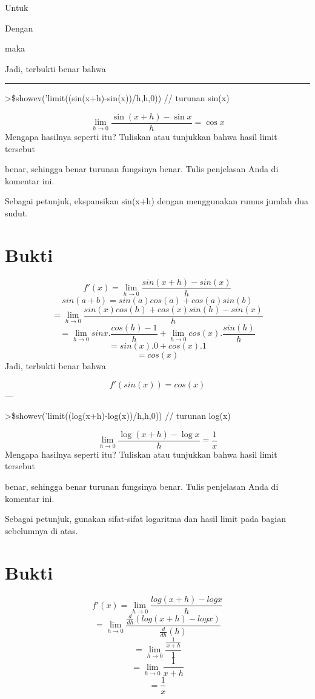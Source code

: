 \documentclass[
]{book}
\begin{document}
Untuk

Dengan

maka

Jadi, terbukti benar bahwa

\begin{center}\rule{0.5\linewidth}{0.5pt}\end{center}

\textgreater\$showev('limit((sin(x+h)-sin(x))/h,h,0)) // turunan sin(x)

\[\lim_{h\rightarrow 0}{\frac{\sin \left(x+h\right)-\sin x}{h}}=\cos 
 x\]Mengapa hasilnya seperti itu? Tuliskan atau tunjukkan bahwa hasil limit tersebut

benar, sehingga benar turunan fungsinya benar. Tulis penjelasan Anda di komentar ini.

Sebagai petunjuk, ekspansikan sin(x+h) dengan menggunakan rumus jumlah dua sudut.

\section{Bukti}\label{bukti-1}

\[f'(x) = \lim_{h\to 0} \frac{sin(x+h)-sin(x)}{h}\]\[sin(a+b)=sin(a)cos(a)+cos(a)sin(b)\]\[= \lim_{h\to 0} \frac{sin(x)cos(h)+cos(x)sin(h)-sin(x)}{h}\]\[= \lim_{h\to 0} sinx.\frac{cos(h)-1}{h}+\lim_{h\to 0} cos(x).\frac{sin(h)}{h}\]\[= sin(x).0+cos(x).1\]\[= cos(x)\]Jadi, terbukti benar bahwa

\[f'(sin(x)) = cos(x)\]---

\textgreater\$showev('limit((log(x+h)-log(x))/h,h,0)) // turunan log(x)

\[\lim_{h\rightarrow 0}{\frac{\log \left(x+h\right)-\log x}{h}}=
 \frac{1}{x}\]Mengapa hasilnya seperti itu? Tuliskan atau tunjukkan bahwa hasil limit tersebut

benar, sehingga benar turunan fungsinya benar. Tulis penjelasan Anda di komentar ini.

Sebagai petunjuk, gunakan sifat-sifat logaritma dan hasil limit pada bagian sebelumnya di atas.

\section{Bukti}\label{bukti-2}

\[f'(x) = \lim_{h\to 0} \frac{log(x+h)-log x}{h}\]\[=\lim_{h\to 0} \frac{\frac{d}{dh}(log(x+h)-log x)}{\frac{d}{dh}(h)}\]\[=\lim_{h\to 0} \frac{\frac{1}{x+h}}{1}\]\[=\lim_{h\to 0} \frac{1}{x+h}\]\[=\frac{1}{x}\]
\end{document}
